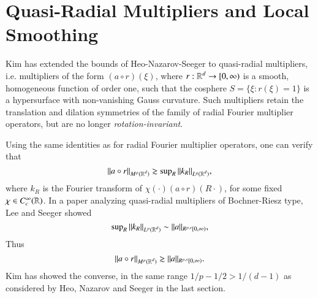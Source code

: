 %
%






\section{Quasi-Radial Multipliers and Local Smoothing}

Kim \cite{KimQuasiradial} has extended 
the bounds of Heo-Nazarov-Seeger to quasi-radial multipliers, i.e. multipliers of the form $(a \circ r)(\xi)$, where $r: \operatorname{\mathbb{R}}^d \to [0,\infty)$ is a smooth, homogeneous function of order one, such that the cosphere $S = \{ \xi : r(\xi) = 1 \}$ is a hypersurface with non-vanishing Gauss curvature. Such multipliers retain the translation and dilation symmetries of the family of radial Fourier multiplier operators, but are no longer \emph{rotation-invariant}.

Using the same identities as for radial Fourier multiplier operators, one can verify that
%
\begin{equation}
  \| a \circ r \|_{M^p(\operatorname{\mathbb{R}}^d)} \gtrsim \sup\nolimits_R \| k_R \|_{L^q(\operatorname{\mathbb{R}}^d)},
\end{equation}
%
where $k_R$ is the Fourier transform of $\chi(\cdot) (a \circ r)(R \cdot)$, for some fixed $\chi \in C_c^\infty(\operatorname{\mathbb{R}})$. In a paper analyzing quasi-radial multipliers of Bochner-Riesz type, Lee and Seeger \cite{LeeSeeger2} showed
%
\begin{equation}
  \sup\nolimits_R \| k_R \|_{L^p(\operatorname{\mathbb{R}}^d)} \sim \| a \|_{R^{p,s}[0,\infty)},
\end{equation}
%
Thus
%
\begin{equation} \label{auiwodjawiodjawoi2342342}
  \| a \circ r \|_{M^p(\operatorname{\mathbb{R}}^d)} \gtrsim \| a \|_{R^{p,s}[0,\infty)}.
\end{equation}
%
Kim \cite{KimQuasiradial} has showed the converse, in the same range $1/p - 1/2 > 1/(d-1)$ as considered by Heo, Nazarov and Seeger in the last section.

